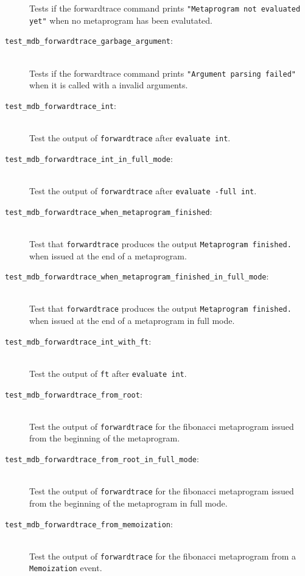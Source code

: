 \begin{description}
        Tests if the forwardtrace command prints
        \texttt{"Metaprogram not evaluated yet"} when no metaprogram has been
        evalutated.
    \item[\texttt{test\_mdb\_forwardtrace\_garbage\_argument}:] \hfill \\
        Tests if the forwardtrace command prints
        \texttt{"Argument parsing failed"} when it is called with a invalid
        arguments.
    \item[\texttt{test\_mdb\_forwardtrace\_int}:] \hfill \\
        Test the output of \texttt{forwardtrace} after \texttt{evaluate int}.
    \item[\texttt{test\_mdb\_forwardtrace\_int\_in\_full\_mode}:] \hfill \\
        Test the output of \texttt{forwardtrace} after
        \texttt{evaluate -full int}.
    \item[\texttt{test\_mdb\_forwardtrace\_when\_metaprogram\_finished}:] \hfill \\
        Test that \texttt{forwardtrace} produces the output
        \texttt{Metaprogram finished.} when issued at the end of a metaprogram.
    \item[\texttt{test\_mdb\_forwardtrace\_when\_metaprogram\_finished\_in\_full\_mode}:] \hfill \\
        Test that \texttt{forwardtrace} produces the output
        \texttt{Metaprogram finished.} when issued at the end of a metaprogram
        in full mode.
    \item[\texttt{test\_mdb\_forwardtrace\_int\_with\_ft}:] \hfill \\
        Test the output of \texttt{ft} after \texttt{evaluate int}.
    \item[\texttt{test\_mdb\_forwardtrace\_from\_root}:] \hfill \\
        Test the output of \texttt{forwardtrace} for the fibonacci metaprogram
        issued from the beginning of the metaprogram.
    \item[\texttt{test\_mdb\_forwardtrace\_from\_root\_in\_full\_mode}:] \hfill \\
        Test the output of \texttt{forwardtrace} for the fibonacci metaprogram
        issued from the beginning of the metaprogram in full mode.
    \item[\texttt{test\_mdb\_forwardtrace\_from\_memoization}:] \hfill \\
        Test the output of \texttt{forwardtrace} for the fibonacci metaprogram
        from a \texttt{Memoization} event.

\end{description}
